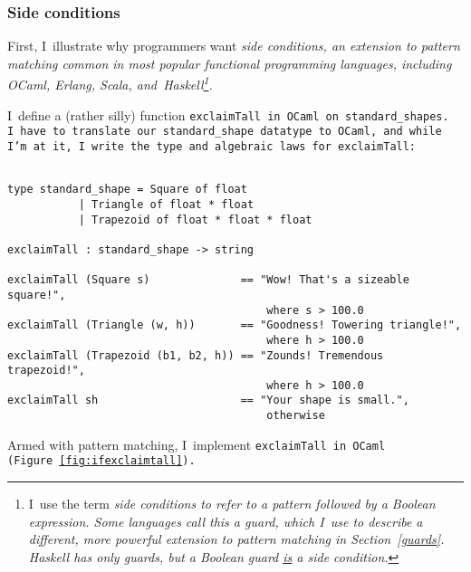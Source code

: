 \documentclass[manuscript,screen,review, 12pt, nonacm]{acmart}
\begin{document}
\subsubsection{Side conditions}

    First, I~illustrate why programmers want \it{side conditions}, an extension
    to pattern matching common in most popular functional programming languages,
    including OCaml, Erlang, Scala, and~Haskell\footnote{I~use the term \it{side
    conditions} to refer to a pattern followed by a Boolean expression. Some
    languages call this a \it{guard}, which I~use to describe a different, more
    powerful extension to pattern matching in Section~\ref{guards}. Haskell has
    \it{only} guards, but a Boolean guard \underline{is} a side condition.}. 
    
    I~define a (rather silly) function \tt{exclaimTall} in OCaml on
    \tt{standard\_shape}s. I~have to translate our \tt{standard\_shape} datatype to OCaml, and
    while I'm at it, I~write the type and algebraic laws for
    \tt{exclaimTall}:

    \begin{minipage}[t]{\textwidth}        
        \centering 
        \begin{verbatim}

type standard_shape = Square of float 
           | Triangle of float * float
           | Trapezoid of float * float * float

exclaimTall : standard_shape -> string 

exclaimTall (Square s)              == "Wow! That's a sizeable square!", 
                                        where s > 100.0
exclaimTall (Triangle (w, h))       == "Goodness! Towering triangle!",
                                        where h > 100.0
exclaimTall (Trapezoid (b1, b2, h)) == "Zounds! Tremendous trapezoid!", 
                                        where h > 100.0
exclaimTall sh                      == "Your shape is small.", 
                                        otherwise
    \end{verbatim}
    \end{minipage}

    Armed with pattern matching, I~implement \tt{exclaimTall} in OCaml
    (Figure~\ref{fig:ifexclaimtall}).
\end{document}
